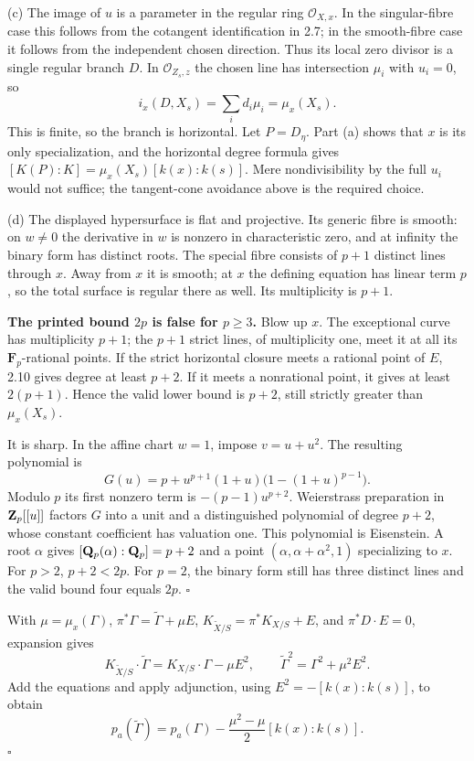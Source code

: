 \documentclass[11pt]{article}
\let\chapterexercise\exercise
\renewcommand{\exercise}[2]{\Needspace{8\baselineskip}\chapterexercise{#1}{#2}}
\begin{document}
(c) The image of $u$ is a parameter in the regular ring $\mathcal O_{X,x}$. In the singular-fibre case this follows from the cotangent identification in 2.7; in the smooth-fibre case it follows from the independent chosen direction. Thus its local zero divisor is a single regular branch $D$. In $\mathcal O_{Z_s,z}$ the chosen line has intersection $\mu_i$ with $u_i=0$, so
\[ i_x(D,X_s)=\sum_i d_i\mu_i=\mu_x(X_s). \]
This is finite, so the branch is horizontal. Let $P=D_\eta$. Part (a) shows that $x$ is its only specialization, and the horizontal degree formula gives $[K(P):K]=\mu_x(X_s)[k(x):k(s)]$. Mere nondivisibility by the full $u_i$ would not suffice; the tangent-cone avoidance above is the required choice.

(d) The displayed hypersurface is flat and projective. Its generic fibre is smooth: on $w\ne0$ the derivative in $w$ is nonzero in characteristic zero, and at infinity the binary form has distinct roots. The special fibre consists of $p+1$ distinct lines through $x$. Away from $x$ it is smooth; at $x$ the defining equation has linear term $p$, so the total surface is regular there as well. Its multiplicity is $p+1$.

\textbf{The printed bound $2p$ is false for $p\ge3$.} Blow up $x$. The exceptional curve has multiplicity $p+1$; the $p+1$ strict lines, of multiplicity one, meet it at all its $\mathbf F_p$-rational points. If the strict horizontal closure meets a rational point of $E$, 2.10 gives degree at least $p+2$. If it meets a nonrational point, it gives at least $2(p+1)$. Hence the valid lower bound is $p+2$, still strictly greater than $\mu_x(X_s)$.

It is sharp. In the affine chart $w=1$, impose $v=u+u^2$. The resulting polynomial is
\[ G(u)=p+u^{p+1}(1+u)\bigl(1-(1+u)^{p-1}\bigr). \]
Modulo $p$ its first nonzero term is $-(p-1)u^{p+2}$. Weierstrass preparation in $\mathbf Z_p[[u]]$ factors $G$ into a unit and a distinguished polynomial of degree $p+2$, whose constant coefficient has valuation one. This polynomial is Eisenstein. A root $\alpha$ gives $[\mathbf Q_p(\alpha):\mathbf Q_p]=p+2$ and a point $(\alpha,\alpha+\alpha^2,1)$ specializing to $x$. For $p>2$, $p+2<2p$. For $p=2$, the binary form still has three distinct lines and the valid bound four equals $2p$. \hfill$\square$

\pf With $\mu=\mu_x(\Gamma)$, $\pi^*\Gamma=\widetilde\Gamma+\mu E$, $K_{\widetilde X/S}=\pi^*K_{X/S}+E$, and $\pi^*D\cdot E=0$, expansion gives
\[ K_{\widetilde X/S}\cdot\widetilde\Gamma=K_{X/S}\cdot\Gamma-\mu E^2,
\qquad \widetilde\Gamma^2=\Gamma^2+\mu^2E^2. \]
Add the equations and apply adjunction, using $E^2=-[k(x):k(s)]$, to obtain
\[ p_a(\widetilde\Gamma)=p_a(\Gamma)-\frac{\mu^2-\mu}{2}[k(x):k(s)]. \]
\hfill$\square$
\end{document}

